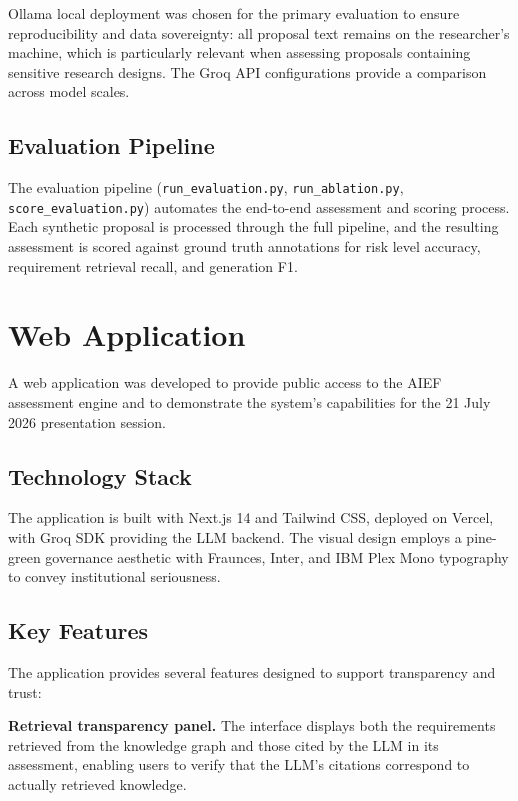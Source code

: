 Ollama local deployment was chosen for the primary evaluation to ensure reproducibility and data sovereignty: all proposal text remains on the researcher's machine, which is particularly relevant when assessing proposals containing sensitive research designs. The Groq API configurations provide a comparison across model scales.


\subsection{Evaluation Pipeline}

The evaluation pipeline (\texttt{run\_evaluation.py}, \texttt{run\_ablation.py}, \texttt{score\_evaluation.py}) automates the end-to-end assessment and scoring process. Each synthetic proposal is processed through the full pipeline, and the resulting assessment is scored against ground truth annotations for risk level accuracy, requirement retrieval recall, and generation F1.


\section{Web Application}
\label{sec:webapp}

A web application was developed to provide public access to the AIEF assessment engine and to demonstrate the system's capabilities for the 21 July 2026 presentation session.

\subsection{Technology Stack}

The application is built with Next.js 14 and Tailwind CSS, deployed on Vercel, with Groq SDK providing the LLM backend. The visual design employs a pine-green governance aesthetic with Fraunces, Inter, and IBM Plex Mono typography to convey institutional seriousness.


\subsection{Key Features}

The application provides several features designed to support transparency and trust:

\textbf{Retrieval transparency panel.} The interface displays both the requirements retrieved from the knowledge graph and those cited by the LLM in its assessment, enabling users to verify that the LLM's citations correspond to actually retrieved knowledge.


